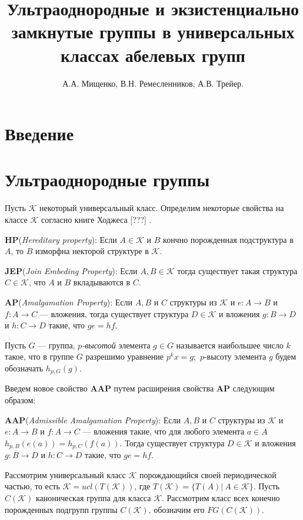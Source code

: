 \documentclass[14pt]{extarticle} %
\title{Ультраоднородные и экзистенциально замкнутые группы в универсальных классах абелевых групп}
\author{А.А. Мищенко, В.Н. Ремесленников, А.В. Трейер.}
\def\K{{\mathcal{K}}}
\def\HP{\textbf{HP}}
\def\JEP{\textbf{JEP}}
\def\AP{\textbf{AP}}
\def\AAP{\textbf{AAP}}
\begin{document}
\maketitle
\tableofcontents
\listoftodos



\section{Введение}

\section{Ультраоднородные группы}

Пусть $\K$ некоторый универсальный класс. Определим некоторые свойства на классе $\K$ согласно книге Ходжеса [???] .

\noindent \HP  (\textit{Hereditary property}): Если $A \in \K$ и $B$ кончно порожденная подструктура в $A$, то $B$ изморфна некторой структуре в $\K$. 

\noindent \JEP  (\textit{Join Embeding Property}): Если $A, B \in \K$ тогда существует такая структура $C \in \K$, что $A$ и $B$ вкладываются в $C$.

\noindent \AP  (\textit{Amalgamation Property}): Если $A, B$ и $C$ структуры из $\K$ и $e : A \rightarrow B$ и $f : A \rightarrow C$ --- вложения, тогда существует структура $D \in \K$ и вложения $g : B \rightarrow D$ и $h : C \rightarrow D$ такие, что $ge = hf$. 

Пусть $G$ --- группа, \textit{$p$-высотой} элемента $g \in G$ называется наибольшее число $k$ такое, что в группе $G$ разрешимо уравнение $p^k x = g;$ $p$-высоту элемента $g$ будем обозначать $h_{p,G}(g).$ 

Введем новое свойство \AAP{} путем расширения свойства \AP{} следующим образом:

\noindent \AAP (\textit{Admissible Amalgamation Property}): Если $A, B$ и $C$ структуры из $\K$ и $e : A \rightarrow B$ и $f : A \rightarrow C$ --- вложения такие, что для любого элемента $a \in A$ $h_{p,B}(e(a)) = h_{p,C}(f(a))$. Тогда существует структура $D \in \K$ и вложения $g : B \rightarrow D$ и $h : C \rightarrow D$ такие, что $ge = hf$. 

Рассмотрим универсальный класс $\K$ порождающийся своей периодической частью, то есть $\K = ucl(T(\K))$, где $T(\K) = \{T(A) | \ A \in \K\}$. Пусть $C(\K)$ каноническая группа для класса $\K$. Рассмотрим класс всех конечно порожденных подгрупп группы $C(\K)$, обозначим его $FG(C(\K))$.
\end{document}
